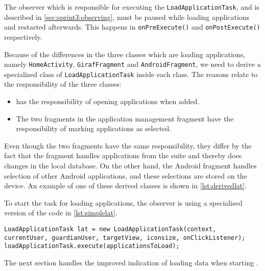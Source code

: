 The observer which is responsible for executing the \lstinline|LoadApplicationTask|, and is described in \cref{sec:sprint3:observing}, must be paused while loading applications and restarted afterwards.
This happens in \lstinline!onPreExecute()! and \lstinline!onPostExecute()! respectively.

Because of the differences in the three classes which are loading applications, namely \lstinline!HomeActivity!, \lstinline!GirafFragment! and \lstinline!AndroidFragment!, we need to derive a specialized class of \lstinline|LoadApplicationTask| inside each class.
The reasons relate to the responsibility of the three classes:
\begin{itemize}
	\item \homeactivity has the responsibility of opening applications when added.
	\item The two fragments in the application management fragment have the responsibility of marking applications as selected.
\end{itemize}

Even though the two fragments have the same responsibility, they differ by the fact that the \giraf fragment handles applications from the \giraf suite and thereby does changes in the local database.
On the other hand, the Android fragment handles selection of other Android applications, and these selections are stored on the device.
An example of one of these derived classes is shown in \cref{lst:derivedlat}.

To start the task for loading applications, the observer is using a specialised version of the code in \cref{lst:simplelat}.

\begin{lstlisting}[caption={The simplified code for loading applications into a view.}, label={lst:simplelat}]
LoadApplicationTask lat = new LoadApplicationTask(context, currentUser, guardianUser, targetView, iconsize, onClickListener);
loadApplicationTask.execute(applicationsToLoad);
\end{lstlisting}

The next section handles the improved indication of loading data when starting \launcher.